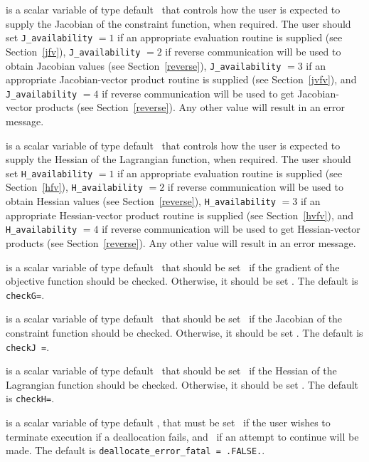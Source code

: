 \documentclass{galahad}
\begin{document}
\begin{description}
 is a scalar variable of type default \integer\
that controls how the user is expected to supply the Jacobian of the
constraint function, when required.  The user should set {\tt J\_availability} $=1$
if an appropriate evaluation routine is supplied (see
Section~\ref{jfv}), {\tt J\_availability} $=2$ if reverse
communication will be used to obtain Jacobian values (see
Section~\ref{reverse}), {\tt J\_availability} $=3$ if an appropriate
Jacobian-vector product routine is supplied (see Section~\ref{jvfv}), and
{\tt J\_availability} $=4$ if reverse communication will be used to
get Jacobian-vector products (see Section~\ref{reverse}).   Any other
value will result in an error message.

 is a scalar variable of type default \integer\
that controls how the user is expected to supply the Hessian of the
Lagrangian function, when required.  The user should set {\tt H\_availability} $=1$
if an appropriate evaluation routine is supplied (see
Section~\ref{hfv}), {\tt H\_availability} $=2$ if reverse
communication will be used to obtain Hessian values (see
Section~\ref{reverse}), {\tt H\_availability} $=3$ if an appropriate
Hessian-vector product routine is supplied (see Section~\ref{hvfv}), and
{\tt H\_availability} $=4$ if reverse communication will be used to
get Hessian-vector products (see Section~\ref{reverse}).   Any other
value will result in an error message.

 is a scalar variable of type default \logical\ that
should be set \true\ if the gradient of the objective function should be
checked.  Otherwise, it should be set \false.  The default is {\tt checkG=\true}.

\itt{checkJ} is a scalar variable of type default \logical\ that
should be set \true\ if the Jacobian of the constraint function should be
checked.  Otherwise, it should be set \false.  The default is {\tt checkJ =\true}.

\itt{checkH} is a scalar variable of type default \logical\ that
should be set \true\ if the Hessian of the Lagrangian function should be
checked.  Otherwise, it should be set \false.  The default is {\tt checkH=\true}.

\itt{deallocate\_error\_fatal} is a scalar variable of type default \logical, 
that must be set \true\ if the user wishes to terminate execution if
a deallocation  fails, and \false\ if an attempt to continue
will be made. The default is {\tt deallocate\_error\_fatal = .FALSE.}.

\end{description}
\end{document}
